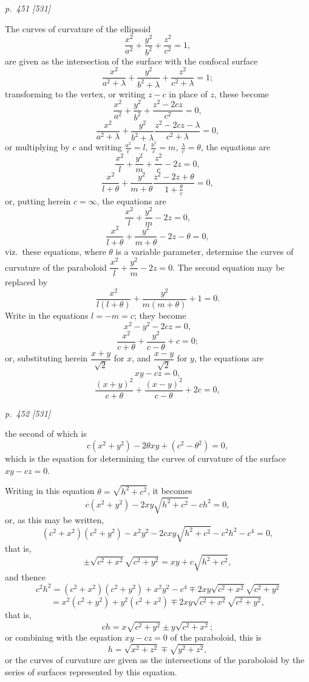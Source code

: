 \documentclass[11pt,a4paper]{article}
\theoremstyle{plain}
\theoremstyle{definition}
\begin{document}
\medskip

\clearpage

\bigskip
\textit{p.~451 [531]}
\smallskip

The curves of curvature of the ellipsoid
\[
\frac{x^2}{a^2} + \frac{y^2}{b^2} + \frac{z^2}{c^2} = 1,
\]
are given as the intersection of the surface with the confocal surface
\[
\frac{x^2}{a^2+\lambda} + \frac{y^2}{b^2+\lambda} + \frac{z^2}{c^2+\lambda} = 1;
\]
transforming to the vertex, or writing $z-c$ in place of $z$, these become
\[
\frac{x^2}{a^2}+\frac{y^2}{b^2}+\frac{z^2-2cz}{c^2}=0,
\]
\[
\frac{x^2}{a^2+\lambda}+\frac{y^2}{b^2+\lambda}
\frac{z^2-2cz-\lambda}{c^2+\lambda}=0,
\]
or multiplying by $c$ and writing $\frac{a^2}{c}=l$, $\frac{b^2}{c}=m$, $\frac{\lambda}{c}=\theta$, the equations are
\[
\frac{x^2}{l}+\frac{y^2}{m}+\frac{z^2}{c}-2z=0,
\]
\[
\frac{x^2}{l+\theta}+\frac{y^2}{m+\theta}
\frac{z^2-2z+\theta}{1+\frac{\theta}{c}}=0,
\]
or, putting herein $c=\infty$, the equations are
\[
\frac{x^2}{l}+\frac{y^2}{m}-2z=0,
\]
\[
\frac{x^2}{l+\theta}+\frac{y^2}{m+\theta}-2z-\theta=0,
\]
viz.\ these equations, where $\theta$ is a variable parameter, determine the curves of curvature
of the paraboloid $\dfrac{x^2}{l}+\dfrac{y^2}{m}-2z=0$. The second equation may be replaced by
\[
\frac{x^2}{l(l+\theta)}+\frac{y^2}{m(m+\theta)}+1=0.
\]
Write in the equations $l = -m = c$; they become
\[
x^2-y^2-2cz=0,
\]
\[
\frac{x^2}{c+\theta}+\frac{y^2}{c-\theta}+c=0;
\]
or, substituting herein $\dfrac{x+y}{\sqrt2}$ for $x$, and $\dfrac{x-y}{\sqrt2}$ for $y$, the equations are
\[
xy-cz=0,
\]
\[
\frac{(x+y)^2}{c+\theta}+\frac{(x-y)^2}{c-\theta}+2c=0,
\]

\clearpage

\bigskip
\textit{p.~452 [531]}
\smallskip

the second of which is
\[
c(x^2 + y^2) - 2\theta xy + (c^2 - \theta^2) = 0,
\]
which is the equation for determining the curves of curvature of the surface $xy - cz = 0$.

Writing in this equation $\theta=\sqrt{h^2+c^2}$, it becomes
\[
c(x^2+y^2)-2xy\sqrt{h^2+c^2}-ch^2=0,
\]
or, as this may be written,
\[
(c^2+x^2)(c^2+y^2)-x^2y^2-2cxy\sqrt{h^2+c^2}-c^2h^2-c^4=0,
\]
that is,
\[
\pm\sqrt{c^2+x^2}\sqrt{c^2+y^2}=xy+c\sqrt{h^2+c^2},
\]
and thence
\[
c^2h^2=(c^2+x^2)(c^2+y^2)+x^2y^2-c^4
\mp2xy\sqrt{c^2+x^2}\sqrt{c^2+y^2}
\]
\[
=x^2(c^2+y^2)+y^2(c^2+x^2)\mp2xy\sqrt{c^2+x^2}\sqrt{c^2+y^2},
\]
that is,
\[
ch=x\sqrt{c^2+y^2}\pm y\sqrt{c^2+x^2};
\]
or combining with the equation $xy-cz=0$ of the paraboloid, this is
\[
h=\sqrt{x^2+z^2}\mp\sqrt{y^2+z^2},
\]
or the curves of curvature are given as the intersections of the paraboloid by the
series of surfaces represented by this equation.
\end{document}
